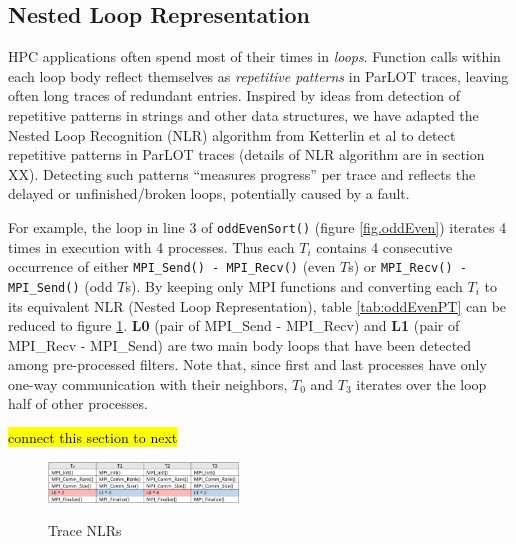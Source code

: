 \subsection{Nested Loop Representation}
HPC applications often spend most of their times in \textit{loops}. Function calls within each loop body reflect themselves as \textit{repetitive patterns} in ParLOT traces, leaving often long traces of redundant entries. 
Inspired by ideas from detection of repetitive patterns in strings \cite{nakamura_fast_2013} and other data structures\cite{kmr}, we have adapted the Nested Loop Recognition (NLR) algorithm from Ketterlin et al\cite{Ketterlin-nlr} to detect repetitive patterns in ParLOT traces (details of NLR algorithm are in section XX). Detecting such patterns ``measures progress'' per trace and reflects the delayed or unfinished/broken loops, potentially caused by a fault.

For example, the loop in line 3 of \texttt{oddEvenSort()} (figure \ref{fig.oddEven}) iterates 4 times in execution with 4 processes. Thus each $T_i$ contains 4 consecutive occurrence of either \texttt{MPI\_Send() - MPI\_Recv()} (even $T$s) or \texttt{MPI\_Recv() - MPI\_Send()} (odd $T$s). By keeping only MPI functions and converting each $T_i$ to its equivalent NLR (Nested Loop Representation), table \ref{tab:oddEvenPT} can be reduced to figure \ref{tab:oddEvenPT-r}. \textbf{L0} (pair of MPI\_Send - MPI\_Recv) and \textbf{L1} (pair of MPI\_Recv - MPI\_Send) are two main body loops that have been detected among pre-processed filters. Note that, since first and last processes have only one-way communication with their neighbors, $T_0$ and $T_3$ iterates over the loop half of other processes.

\hl{connect this section to next}

\begin{figure}[]
\centering
\caption{Trace NLRs}
\includegraphics[width=0.45\textwidth]{figs/oddEvenPT-r.png}
\label{tab:oddEvenPT-r}
\end{figure}


